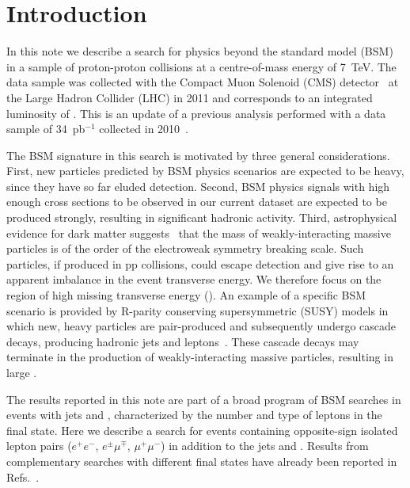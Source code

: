 \section{Introduction}
\label{sec:intro}

In this note we describe a search for physics beyond the standard model (BSM) 
in a sample of proton-proton collisions at a centre-of-mass energy of 7~TeV. 
The data sample was collected with the Compact Muon Solenoid (CMS) detector~\cite{JINST} at 
the Large Hadron Collider (LHC) in 2011
and corresponds to an integrated luminosity of \lumifinal.
This is an update of a previous analysis performed with a data sample of 34~pb$^{-1}$
collected in 2010~\cite{ref:ospaper}.

The BSM signature in this search is motivated  by three general  considerations. 
First, new particles predicted by BSM
physics scenarios are expected to be heavy, since they have so far eluded detection.
Second, BSM physics  signals with  high
enough  cross sections to  be observed  in our  current dataset are expected to be
produced  strongly,  resulting  in  significant hadronic  activity. 
Third, astrophysical evidence for
dark matter  suggests~\cite{ref:DM,ref:DM2}  that the mass  of weakly-interacting
massive particles is of the  order of the electroweak symmetry breaking
scale. Such particles, if produced in pp collisions, could escape detection and give rise to
an apparent imbalance in the  event transverse energy. We therefore focus  on the
region  of  high missing transverse energy (\MET). An  example of  a  specific  BSM scenario  is
provided by R-parity conserving  supersymmetric (SUSY) models in which
new,  heavy  particles  are  pair-produced  and  subsequently  undergo
cascade       decays,      producing      hadronic       jets      and
leptons~\cite{Martin:fk,susy1,susy2,susy3,susy4,susy5,susy6}.  
These cascade decays  may terminate  in the
production  of weakly-interacting massive  particles,  resulting in large \MET.

The results reported in this note are part of a broad program of BSM searches
in events with jets and \MET, characterized by the number and
type of leptons in the final state.  
Here we describe a search for events containing opposite-sign isolated
lepton pairs ($e^+e^-$, $e^{\pm}\mu^{\mp}$, $\mu^+\mu^-$) in addition to the jets
and \MET. Results from complementary searches with different final states have 
already been reported in Refs.~\cite{ref:RA1,ref:SS}.

